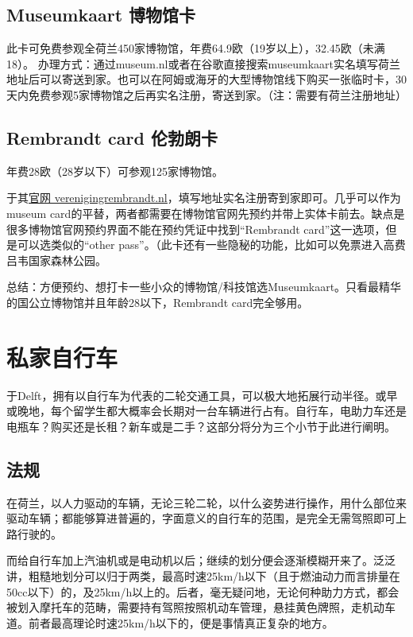 \subsection{Museumkaart 博物馆卡}
此卡可免费参观全荷兰450家博物馆，年费64.9欧（19岁以上），32.45欧（未满18）。
办理方式：通过museum.nl或者在谷歌直接搜索museumkaart实名填写荷兰地址后可以寄送到家。也可以在阿姆或海牙的大型博物馆线下购买一张临时卡，30天内免费参观5家博物馆之后再实名注册，寄送到家。（注：需要有荷兰注册地址）

\subsection{Rembrandt card 伦勃朗卡}
年费28欧（28岁以下）可参观125家博物馆。

于其\href{verenigingrembrandt.nl}{\uline{官网 verenigingrembrandt.nl}}，填写地址实名注册寄到家即可。几乎可以作为museum card的平替，两者都需要在博物馆官网先预约并带上实体卡前去。缺点是很多博物馆官网预约界面不能在预约凭证中找到“Rembrandt card”这一选项，但是可以选类似的“other pass”。（此卡还有一些隐秘的功能，比如可以免票进入高费吕韦国家森林公园。

总结：方便预约、想打卡一些小众的博物馆/科技馆选Museumkaart。只看最精华的国公立博物馆并且年龄28以下，Rembrandt card完全够用。
\vspace{\betsubsec} %


\section{私家自行车}
于Delft，拥有以自行车为代表的二轮交通工具，可以极大地拓展行动半径。或早或晚地，每个留学生都大概率会长期对一台车辆进行占有。自行车，电助力车还是电瓶车？购买还是长租？新车或是二手？这部分将分为三个小节于此进行阐明。

\subsection{法规}
在荷兰，以人力驱动的车辆，无论三轮二轮，以什么姿势进行操作，用什么部位来驱动车辆；都能够算进普遍的，字面意义的自行车的范围，是完全无需驾照即可上路行驶的。

而给自行车加上汽油机或是电动机以后；继续的划分便会逐渐模糊开来了。泛泛讲，粗糙地划分可以归于两类，最高时速25km/h以下（且于燃油动力而言排量在50cc以下）的，及25km/h以上的。后者，毫无疑问地，无论何种助力方式，都会被划入摩托车的范畴，需要持有驾照按照机动车管理，悬挂黄色牌照，走机动车道。前者最高理论时速25km/h以下的，便是事情真正复杂的地方。

